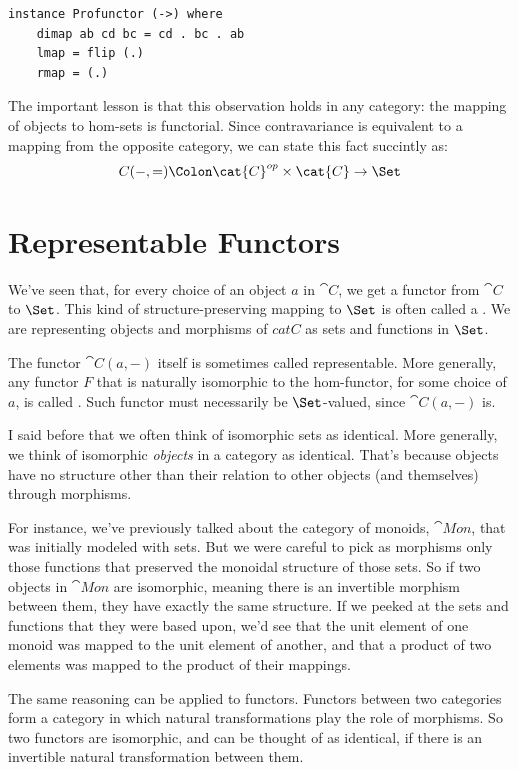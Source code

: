 \begin{Verbatim}
instance Profunctor (->) where
    dimap ab cd bc = cd . bc . ab
    lmap = flip (.)
    rmap = (.)
\end{Verbatim}
The important lesson is that this observation holds in any category: the
mapping of objects to hom-sets is functorial. Since contravariance is
equivalent to a mapping from the opposite category, we can state this
fact succintly as:
\[C(-, =) \Colon \cat{C}^{op} \times \cat{C} \to \Set\]

\section{Representable Functors}

We've seen that, for every choice of an object $a$ in $\cat{C}$,
we get a functor from $\cat{C}$ to $\Set$. This kind of
structure-preserving mapping to $\Set$ is often called a
. We are representing objects and morphisms of
$cat{C}$ as sets and functions in $\Set$.

The functor $\cat{C}(a, -)$ itself is sometimes called representable.
More generally, any functor $F$ that is naturally isomorphic to
the hom-functor, for some choice of $a$, is called
. Such functor must necessarily be
$\Set$-valued, since $\cat{C}(a, -)$ is.

I said before that we often think of isomorphic sets as identical. More
generally, we think of isomorphic \emph{objects} in a category as
identical. That's because objects have no structure other than their
relation to other objects (and themselves) through morphisms.

For instance, we've previously talked about the category of monoids,
$\cat{Mon}$, that was initially modeled with sets. But we were careful
to pick as morphisms only those functions that preserved the monoidal
structure of those sets. So if two objects in $\cat{Mon}$ are
isomorphic, meaning there is an invertible morphism between them, they
have exactly the same structure. If we peeked at the sets and functions
that they were based upon, we'd see that the unit element of one monoid
was mapped to the unit element of another, and that a product of two
elements was mapped to the product of their mappings.

The same reasoning can be applied to functors. Functors between two
categories form a category in which natural transformations play the
role of morphisms. So two functors are isomorphic, and can be thought of
as identical, if there is an invertible natural transformation between
them.

